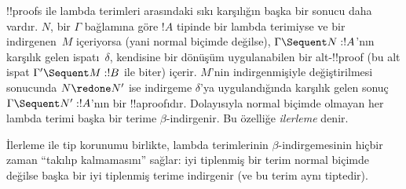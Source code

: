 !!{proof}s ile lambda terimleri arasındaki sıkı karşılığın başka bir sonucu
daha vardır. $N$, bir $\Gamma$ bağlamına göre $!A$ tipinde bir lambda
terimiyse ve bir indirgenen~$M$ içeriyorsa (yani normal biçimde değilse),
$\Gamma \Sequent N : !A$'nın karşılık gelen 
ispatı~$\delta$, kendisine bir dönüşüm uygulanabilen bir alt-!!{proof}
(bu alt ispat $\Gamma' \Sequent M: !B$ ile biter) içerir. $M$'nin
indirgenmişiyle değiştirilmesi sonucunda $N \redone N'$ ise indirgeme
$\delta$'ya uygulandığında karşılık gelen sonuç $\Gamma \Sequent N' : !A$'nın
bir !!a{proof}{}ıdır. Dolayısıyla normal biçimde olmayan her lambda terimi
başka bir terime $\beta$-indirgenir. Bu özelliğe \emph{ilerleme} denir.

İlerleme ile tip korunumu birlikte, lambda terimlerinin $\beta$-indirgemesinin
hiçbir zaman ``takılıp kalmamasını'' sağlar: iyi tiplenmiş bir terim normal
biçimde değilse başka bir iyi tiplenmiş terime indirgenir (ve bu terim aynı
tiptedir).

